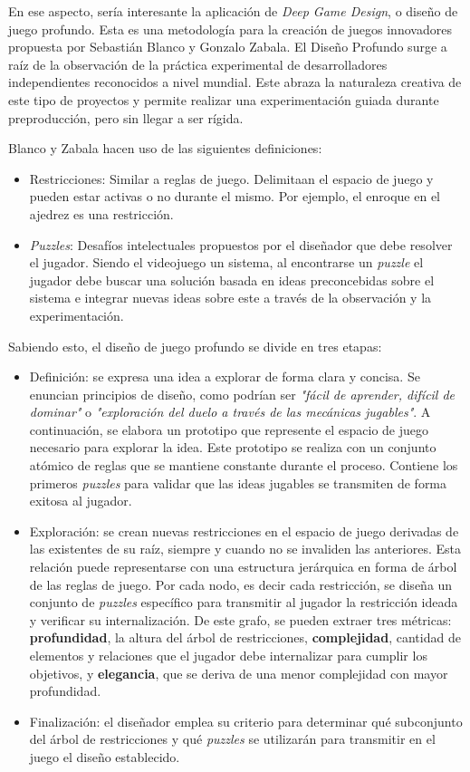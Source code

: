 En ese aspecto, sería interesante la aplicación de \textit{Deep Game Design}, o diseño de juego profundo. Esta es una metodología para la creación de juegos innovadores propuesta por Sebastián Blanco y Gonzalo Zabala\cite{deepdesign}. El Diseño Profundo surge a raíz de la observación de la práctica experimental de desarrolladores independientes reconocidos a nivel mundial. Este abraza la naturaleza creativa de este tipo de proyectos y permite realizar una experimentación guiada durante preproducción, pero sin llegar a ser rígida.

Blanco y Zabala hacen uso de las siguientes definiciones:

\begin{itemize}
    \item Restricciones: Similar a reglas de juego. Delimitaan el espacio de juego y pueden estar activas o no durante el mismo. Por ejemplo, el enroque en el ajedrez es una restricción.
    \item \textit{Puzzles}: Desafíos intelectuales propuestos por el diseñador que debe resolver el jugador. Siendo el videojuego un sistema, al encontrarse un \textit{puzzle} el jugador debe buscar una solución basada en ideas preconcebidas sobre el sistema e integrar nuevas ideas sobre este a través de la observación y la experimentación.
\end{itemize}

Sabiendo esto, el diseño de juego profundo se divide en tres etapas:

\begin{itemize}
    \item Definición: se expresa una idea a explorar de forma clara y concisa. Se enuncian principios de diseño, como podrían ser \textit{"fácil de aprender, difícil de dominar"} o \textit{"exploración del duelo a través de las mecánicas jugables"}. A continuación, se elabora un prototipo que represente el espacio de juego necesario para explorar la idea. Este prototipo se realiza con un conjunto atómico de reglas que se mantiene constante durante el proceso. Contiene los primeros \textit{puzzles} para validar que las ideas jugables se transmiten de forma exitosa al jugador.
    \item Exploración: se crean nuevas restricciones en el espacio de juego derivadas de las existentes de su raíz, siempre y cuando no se invaliden las anteriores. Esta relación puede representarse con una estructura jerárquica en forma de árbol de las reglas de juego. Por cada nodo, es decir cada restricción, se diseña un conjunto de \textit{puzzles} específico para transmitir al jugador la restricción ideada y verificar su internalización. De este grafo, se pueden extraer tres métricas: \textbf{profundidad}, la altura del árbol de restricciones, \textbf{complejidad}, cantidad de elementos y relaciones que el jugador debe internalizar para cumplir los objetivos, y \textbf{elegancia}, que se deriva de una menor complejidad con mayor profundidad.
    \item Finalización: el diseñador emplea su criterio para determinar qué subconjunto del árbol de restricciones y qué \textit{puzzles} se utilizarán para transmitir en el juego el diseño establecido.
\end{itemize}

